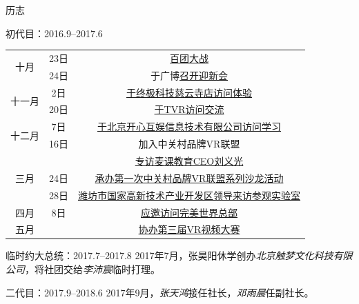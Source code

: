 \documentclass{paper}
\newcommand{\name}[1]{{\em #1}}
\begin{document}
\begin{section}{历志}
\begin{subsection}{初代目：2016.9--2017.6}
\begin{table}[H]
\begin{center}
\begin{tabular}{|c|c|c|}
				\multirow{2}{*}{十月}
				& 23日 & \href{https://mp.weixin.qq.com/s/x85rf1f-2Rol9m0SSdo-NQ}{百团大战} \\
				& 24日 & 于广博\href{https://mp.weixin.qq.com/s/6gHHMyfORHuOgh5wh0gxmQ}{召开迎新会} \\ \hline

				\multirow{2}{*}{十一月}
				& 2日 & \href{https://mp.weixin.qq.com/s/zFRpFf-90lzlfQhYlOh0Yw}{于终极科技慈云寺店访问体验} \\
				& 20日 & \href{https://mp.weixin.qq.com/s/WqN5Na-M-45fKG6UV-pSZA}{于TVR访问交流} \\ \hline

				\multirow{2}{*}{十二月}
				& 7日 & \href{https://mp.weixin.qq.com/s/43pTM3BWA1HeuyP2wj4zgA}{于北京开心互娱信息技术有限公司访问学习} \\
				& 16日 & 加入中关村品牌VR联盟 \\ \hline

				\multirow{3}{*}{三月}
				& & \href{https://mp.weixin.qq.com/s/eRU1DgRMs7Z62imheJksYA}{专访麦课教育CEO刘义光} \\
				& 24日 & \href{https://mp.weixin.qq.com/s/7OYzm3obpub49CM9at3wcw}{承办第一次中关村品牌VR联盟系列沙龙活动} \\
				& 28日 & \href{https://mp.weixin.qq.com/s/qWsWQ3jKt6SSnXNCPYzbkA}{潍坊市国家高新技术产业开发区领导来访参观实验室} \\ \hline

				\multirow{1}{*}{四月}
				& 8日 & \href{https://mp.weixin.qq.com/s/fcz9Pao__yQIYgcQhOw7nw}{应邀访问完美世界总部} \\ \hline

				\multirow{1}{*}{五月}
				& & \href{https://mp.weixin.qq.com/s/PNQWssw45hEL54-5yCKsRg}{协办第三届VR视频大赛} \\ \hline
			\end{tabular}
		\end{center}\end{table}
	\end{subsection}
	\begin{subsection}{临时约大总统：2017.7--2017.8}
		2017年7月，张昊阳休学创办\name{北京触梦文化科技有限公司}，将社团交给\name{李沛宸}临时打理。
	\end{subsection}
	\begin{subsection}{二代目：2017.9--2018.6}
		2017年9月，\name{张天鸿}接任社长，\name{邓雨晨}任副社长。


\end{subsection}
\end{section}
\end{document}
